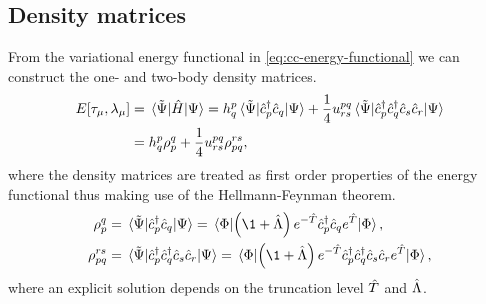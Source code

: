         \subsection{Density matrices}
            From the variational energy functional in
            \autoref{eq:cc-energy-functional} we can construct the one- and
            two-body density matrices.
            \begin{align}
                E[\tau_{\mu}, \lambda_{\mu}]
                &= \mel*{\tilde{\Psi}}{\hat{H}}{\Psi}
                = h^{p}_{q}
                \mel*{\tilde{\Psi}}{\hat{c}_{p}^{\dagger}\hat{c}_{q}}{\Psi}
                + \frac{1}{4}
                u^{pq}_{rs}
                \mel*{\tilde{\Psi}}{\hat{c}_{p}^{\dagger}\hat{c}_{q}^{\dagger}\hat{c}_{s}\hat{c}_{r}}{\Psi}
                \\
                &=
                h^{p}_{q} \rho^{q}_{p}
                + \frac{1}{4}
                u^{pq}_{rs}
                \rho^{rs}_{pq},
            \end{align}
            where the density matrices are treated as first order properties of
            the energy functional thus making use of the Hellmann-Feynman
            theorem.
            \begin{align}
                \densityten^{q}_{p}
                &= \mel*{\tilde{\Psi}}{\ccr{p}\can{q}}{\Psi}
                = \mel*{\slat}{
                    \para{\1 + \clustl}e^{-\clust}\ccr{p}\can{q} e^{\clust}
                }{\slat},
                \label{eq:cc-one-body-density}
                \\
                \densityten^{rs}_{pq}
                &= \mel*{\tilde{\Psi}}{
                    \ccr{p}\ccr{q}\can{s}\can{r}
                }{\Psi}
                = \mel*{\slat}{
                    \para{\1 + \clustl}e^{-\clust}
                    \ccr{p}\ccr{q}
                    \can{s}\can{r}
                    e^{\clust}
                }{\slat},
                \label{eq:cc-two-body-density}
            \end{align}
            where an explicit solution depends on the truncation level $\hat{T}$
            and $\hat{\Lambda}$.

